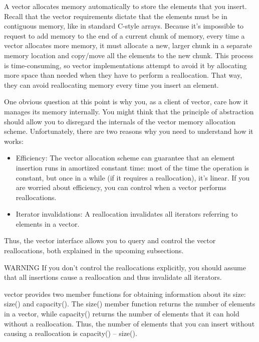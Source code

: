 
A vector allocates memory automatically to store the elements that you insert. Recall that the vector requirements dictate that the elements must be in contiguous memory, like in standard C-style arrays. Because it’s impossible to request to add memory to the end of a current chunk of memory, every time a vector allocates more memory, it must allocate a new, larger chunk in a separate memory location and copy/move all the elements to the new chunk. This process is time-consuming, so vector implementations attempt to avoid it by allocating more space than needed when they have to perform a reallocation. That way, they can avoid reallocating memory every time you insert an element.

One obvious question at this point is why you, as a client of vector, care how it manages its memory internally. You might think that the principle of abstraction should allow you to disregard the internals of the vector memory allocation scheme. Unfortunately, there are two reasons why you need to understand how it works:

\begin{itemize}
\item
Efficiency: The vector allocation scheme can guarantee that an element insertion runs in amortized constant time: most of the time the operation is constant, but once in a while (if it requires a reallocation), it’s linear. If you are worried about efficiency, you can control when a vector performs reallocations.

\item
Iterator invalidations: A reallocation invalidates all iterators referring to elements in a vector.
\end{itemize}

Thus, the vector interface allows you to query and control the vector reallocations, both explained in the upcoming subsections.

\begin{myWarning}{WARNING}
If you don’t control the reallocations explicitly, you should assume that all insertions cause a reallocation and thus invalidate all iterators.
\end{myWarning}


vector provides two member functions for obtaining information about its size: size() and capacity(). The size() member function returns the number of elements in a vector, while capacity() returns the number of elements that it can hold without a reallocation. Thus, the number of elements that you can insert without causing a reallocation is capacity() – size().

